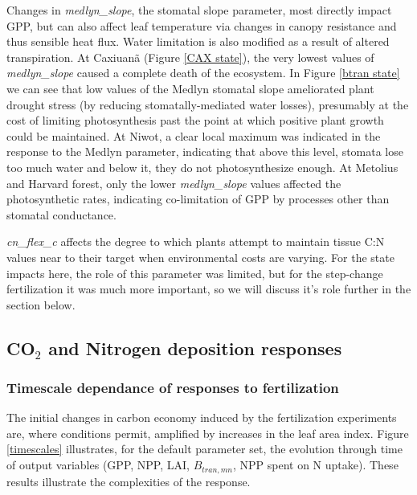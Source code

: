 \documentclass[draft,linenumbers]{agujournal}
\begin{document}
Changes in \emph{medlyn\_slope}, the stomatal slope parameter, most directly impact GPP, but can also affect leaf temperature via changes in canopy resistance and thus sensible heat flux. Water limitation is also modified as a result of altered transpiration. At Caxiuan\~a (Figure \ref{CAX state}), the very lowest values of  \emph{medlyn\_slope} caused a complete death of the ecosystem. In Figure \ref{btran state} we can see that low values of the Medlyn stomatal slope ameliorated plant drought stress (by reducing stomatally-mediated water losses), presumably at the cost of limiting photosynthesis past the point at which positive plant growth could be maintained. At Niwot, a clear local maximum was indicated in the response to the Medlyn parameter, indicating that above this level, stomata lose too much water and below it, they do not photosynthesize enough. At Metolius and Harvard forest, only the lower \emph{medlyn\_slope} values affected the photosynthetic rates, indicating co-limitation of GPP by processes other than stomatal conductance.  

 \emph{cn\_flex\_c} affects the degree to which plants attempt to maintain tissue C:N values near to their target when environmental costs are varying. For the state impacts here, the role of this parameter was limited, but for the step-change fertilization it was much more important, so we will discuss it's role further in the section below. 

\subsection{CO$_{2}$ and Nitrogen deposition responses}


\subsubsection{Timescale dependance of responses to fertilization}

The initial changes in carbon economy induced by the fertilization experiments are, where conditions permit, amplified by increases in the leaf area index.  Figure \ref{timescales} illustrates, for the default parameter set, the evolution through time of output variables (GPP, NPP, LAI, $B_{tran,mn}$, NPP spent on N uptake). These results illustrate the complexities of the response. 
\end{document}
